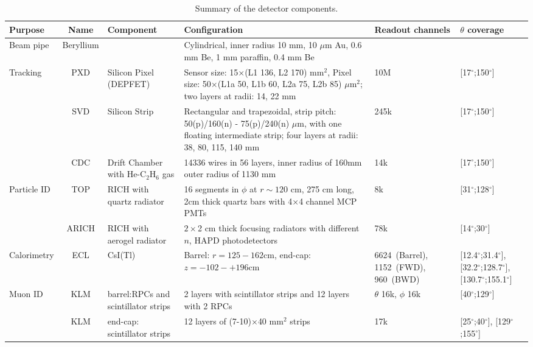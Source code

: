 \begin{sidewaystable*}
\centering
\caption{Summary of the detector components\cite{physics_book}.}
\label{tab:detector_summary}
\small
\begin{tabularx}{1.0\linewidth}{lcXXXX} 
\hline
Purpose & Name & Component & Configuration & Readout channels & $\theta$ coverage \\%
\hline
Beam pipe & Beryllium& & Cylindrical, inner radius 10 mm, 10 $\mu$m Au, 0.6 mm Be,
1 mm paraffin, 0.4 mm Be \\
\hline
Tracking 	& PXD& Silicon Pixel (DEPFET)& Sensor size: 15$\times$(L1 136, L2 170) mm$^2$, Pixel size: 50$\times$(L1a 50, L1b 60, L2a 75, L2b 85) $\mu$m$^2$; two layers at radii: 14, 22 mm & 10M & [17$^\circ$;150$^\circ$]\\ 
 	   	& SVD& Silicon Strip& Rectangular and trapezoidal, strip pitch: 50(p)/160(n) - 75(p)/240(n) $\mu$m, with one floating intermediate strip; four layers at radii: 38, 80, 115, 140 mm  & 245k& [17$^\circ$;150$^\circ$]\\  
		& CDC& Drift Chamber with He-C$_2$H$_6$ gas& 14336 wires in 56 layers, inner radius of 160mm outer radius of 1130 mm & 14k & [17$^\circ$;150$^\circ$]\\ 
\hline
Particle ID & TOP& RICH with quartz radiator &  16 segments in $\phi$ at $r\sim120$ cm, 275 cm long, 2cm thick quartz bars with 4$\times$4 channel MCP PMTs& 8k& [31$^\circ$;128$^\circ$] \\
				& ARICH& RICH with aerogel radiator & $2\times$2 cm thick focusing radiators with different $n$, HAPD photodetectors & 78k & [14$^\circ$;30$^\circ$]\\
\hline
Calorimetry& ECL&  CsI(Tl)& Barrel: $r=125-162$cm, end-cap: $z=-102-+196$cm & 6624~(Barrel), 1152~(FWD), 960~(BWD) & [12.4$^\circ$;31.4$^\circ$], [32.2$^\circ$;128.7$^\circ$], [130.7$^\circ$;155.1$^\circ$]\\%
\hline
Muon ID & KLM& barrel:RPCs and scintillator strips 			& 2 layers with scintillator strips  and 12 layers with 2 RPCs& $\theta$ 16k, $\phi$ 16k & [40$^\circ$;129$^\circ$] \\
			& KLM& end-cap: scintillator strips 	& 12 layers of (7-10)$\times$40 mm$^2$ strips & 17k & [25$^\circ$;40$^\circ$], [129$^\circ$;155$^\circ$]\\		
\hline
\end{tabularx}
\end{sidewaystable*}



